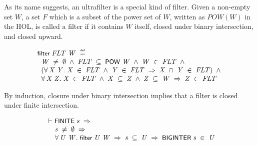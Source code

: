 \documentclass[letterpaper]{article}
\renewcommand{\HOLConst}[1]{{\textsf{\upshape\small #1}}}
\newenvironment{holmath}{\begin{displaymath}\begin{array}{l}}{\end{array}\end{displaymath}\ignorespacesafterend}
\begin{document}
As its name suggests, an ultrafilter is a special kind of filter. Given a non-empty set $W$, a set $F$ which is a subset of the power set of $W$, written as $POW(W)$ in the HOL, is called a filter if it contains $W$ itself, closed under binary intersection, and closed upward.

\begin{holmath}
  \HOLConst{filter}\;\HOLFreeVar{FLT}\;\HOLFreeVar{W}\;\HOLSymConst{\HOLTokenDefEquality{}}\\
\;\;\HOLFreeVar{W}\;\HOLSymConst{\HOLTokenNotEqual{}}\;\HOLSymConst{\HOLTokenEmpty{}}\;\HOLSymConst{\HOLTokenConj{}}\;\HOLFreeVar{FLT}\;\HOLSymConst{\HOLTokenSubset{}}\;\HOLConst{POW}\;\HOLFreeVar{W}\;\HOLSymConst{\HOLTokenConj{}}\;\HOLFreeVar{W}\;\HOLSymConst{\HOLTokenIn{}}\;\HOLFreeVar{FLT}\;\HOLSymConst{\HOLTokenConj{}}\\
\;\;(\HOLSymConst{\HOLTokenForall{}}\HOLBoundVar{X}\;\HOLBoundVar{Y}.\;\HOLBoundVar{X}\;\HOLSymConst{\HOLTokenIn{}}\;\HOLFreeVar{FLT}\;\HOLSymConst{\HOLTokenConj{}}\;\HOLBoundVar{Y}\;\HOLSymConst{\HOLTokenIn{}}\;\HOLFreeVar{FLT}\;\HOLSymConst{\HOLTokenImp{}}\;\HOLBoundVar{X}\;\HOLSymConst{\HOLTokenInter{}}\;\HOLBoundVar{Y}\;\HOLSymConst{\HOLTokenIn{}}\;\HOLFreeVar{FLT})\;\HOLSymConst{\HOLTokenConj{}}\\
\;\;\HOLSymConst{\HOLTokenForall{}}\HOLBoundVar{X}\;\HOLBoundVar{Z}.\;\HOLBoundVar{X}\;\HOLSymConst{\HOLTokenIn{}}\;\HOLFreeVar{FLT}\;\HOLSymConst{\HOLTokenConj{}}\;\HOLBoundVar{X}\;\HOLSymConst{\HOLTokenSubset{}}\;\HOLBoundVar{Z}\;\HOLSymConst{\HOLTokenConj{}}\;\HOLBoundVar{Z}\;\HOLSymConst{\HOLTokenSubset{}}\;\HOLFreeVar{W}\;\HOLSymConst{\HOLTokenImp{}}\;\HOLBoundVar{Z}\;\HOLSymConst{\HOLTokenIn{}}\;\HOLFreeVar{FLT}
\end{holmath}

By induction, closure under binary intersection implies that a filter is closed under finite intersection.

\begin{holmath}
  \ensuremath{\HOLTokenTurnstile}\HOLConst{FINITE}\;\HOLFreeVar{s}\;\HOLSymConst{\HOLTokenImp{}}\\
\;\;\;\;\;\HOLFreeVar{s}\;\HOLSymConst{\HOLTokenNotEqual{}}\;\HOLSymConst{\HOLTokenEmpty{}}\;\HOLSymConst{\HOLTokenImp{}}\\
\;\;\;\;\;\HOLSymConst{\HOLTokenForall{}}\HOLBoundVar{U}\;\HOLBoundVar{W}.\;\HOLConst{filter}\;\HOLBoundVar{U}\;\HOLBoundVar{W}\;\HOLSymConst{\HOLTokenImp{}}\;\HOLFreeVar{s}\;\HOLSymConst{\HOLTokenSubset{}}\;\HOLBoundVar{U}\;\HOLSymConst{\HOLTokenImp{}}\;\HOLConst{BIGINTER}\;\HOLFreeVar{s}\;\HOLSymConst{\HOLTokenIn{}}\;\HOLBoundVar{U}
\end{holmath}
\end{document}

